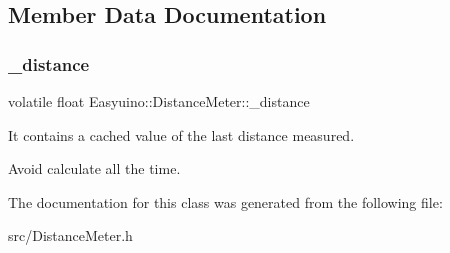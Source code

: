 \subsection{Member Data Documentation}
\mbox{\label{class_easyuino_1_1_distance_meter_ae10df1a21d2acfec3aa3eef57ea3a632}} 
\subsubsection{\texorpdfstring{\+\_\+distance}{\_distance}}
{\footnotesize\ttfamily volatile float Easyuino\+::\+Distance\+Meter\+::\+\_\+distance\hspace{0.3cm}{\ttfamily [protected]}}



It contains a cached value of the last distance measured. 

Avoid calculate all the time. 

The documentation for this class was generated from the following file\+:\begin{DoxyCompactItemize}
\item 
src/Distance\+Meter.\+h\end{DoxyCompactItemize}
